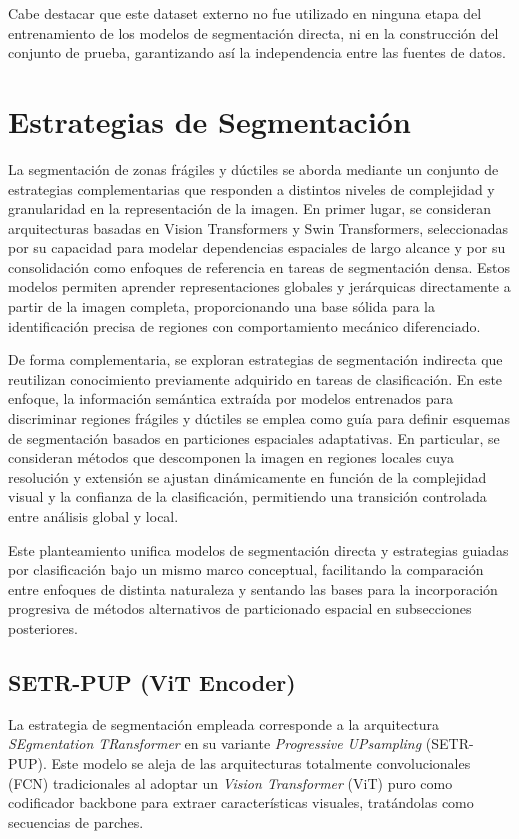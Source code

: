 \documentclass[onecolumn, 12pt , journal]{IEEEtran}
\begin{document}
Cabe destacar que este dataset externo no fue utilizado en ninguna etapa del entrenamiento de los modelos de segmentación directa, ni en la construcción del conjunto de prueba, garantizando así la independencia entre las fuentes de datos.


\section{Estrategias de Segmentación}
La segmentación de zonas frágiles y dúctiles se aborda mediante un conjunto de estrategias complementarias que responden a distintos niveles de complejidad y granularidad en la representación de la imagen. En primer lugar, se consideran arquitecturas basadas en Vision Transformers y Swin Transformers, seleccionadas por su capacidad para modelar dependencias espaciales de largo alcance y por su consolidación como enfoques de referencia en tareas de segmentación densa. Estos modelos permiten aprender representaciones globales y jerárquicas directamente a partir de la imagen completa, proporcionando una base sólida para la identificación precisa de regiones con comportamiento mecánico diferenciado.

De forma complementaria, se exploran estrategias de segmentación indirecta que reutilizan conocimiento previamente adquirido en tareas de clasificación. En este enfoque, la información semántica extraída por modelos entrenados para discriminar regiones frágiles y dúctiles se emplea como guía para definir esquemas de segmentación basados en particiones espaciales adaptativas. En particular, se consideran métodos que descomponen la imagen en regiones locales cuya resolución y extensión se ajustan dinámicamente en función de la complejidad visual y la confianza de la clasificación, permitiendo una transición controlada entre análisis global y local.

Este planteamiento unifica modelos de segmentación directa y estrategias guiadas por clasificación bajo un mismo marco conceptual, facilitando la comparación entre enfoques de distinta naturaleza y sentando las bases para la incorporación progresiva de métodos alternativos de particionado espacial en subsecciones posteriores.


\subsection{SETR-PUP (ViT Encoder)}

La estrategia de segmentación empleada corresponde a la arquitectura \emph{SEgmentation TRansformer} en su variante \emph{Progressive UPsampling} (SETR-PUP). Este modelo se aleja de las arquitecturas totalmente convolucionales (FCN) tradicionales al adoptar un \emph{Vision Transformer} (ViT) puro como codificador backbone para extraer características visuales, tratándolas como secuencias de parches.
\end{document}

